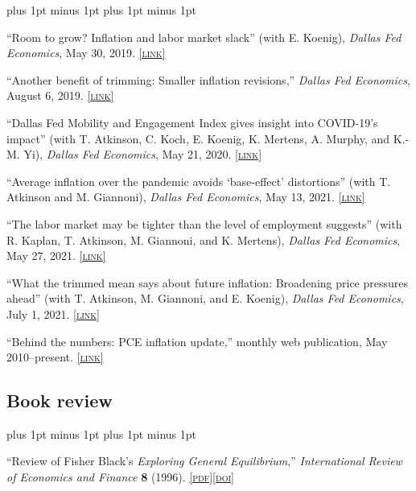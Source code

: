 \documentclass[letterpaper]{article}
\renewenvironment{itemize}{
  \begin{list}{}{
    \setlength{\leftmargin}{1.5em}
    \itemsep -1pt plus 1pt minus 1pt
    \topsep -1pt plus 1pt minus 1pt
  }
}{
  \end{list}
}
\newcommand{\pdf}[1]{\href{#1}{\scriptsize\textsc{[pdf]}}}
\newcommand{\doi}[1]{\href{http://dx.doi.org/#1}{\scriptsize\textsc{[doi]}}}
\newcommand{\link}[1]{\href{#1}{\scriptsize\textsc{[link]}}}
\begin{document}
\begin{itemize}
\item ``Room to grow? Inflation and labor market slack'' (with E. Koenig), \textit{Dallas Fed Economics}, May 30, 2019. \link{https://www.dallasfed.org/research/economics/2019/0530}

\item ``Another benefit of trimming: Smaller inflation revisions,'' \textit{Dallas Fed Economics}, August 6, 2019. \link{https://www.dallasfed.org/research/economics/2019/0806}

\item ``Dallas Fed Mobility and Engagement Index gives insight into COVID-19's impact'' (with T. Atkinson, C. Koch, E. Koenig, K. Mertens, A. Murphy, and K.-M. Yi), \textit{Dallas Fed Economics}, May 21, 2020. \link{https://www.dallasfed.org/research/economics/2020/0521}

\item ``Average inflation over the pandemic avoids `base-effect' distortions'' (with T. Atkinson and M. Giannoni), \textit{Dallas Fed Economics}, May 13, 2021. \link{https://www.dallasfed.org/research/economics/2021/0513}

\item ``The labor market may be tighter than the level of employment suggests'' (with R. Kaplan, T. Atkinson, M. Giannoni, and K. Mertens), \textit{Dallas Fed Economics}, May 27, 2021. \link{https://www.dallasfed.org/research/economics/2021/0527}

\item ``What the trimmed mean says about future inflation: Broadening price pressures ahead'' (with T. Atkinson, M. Giannoni, and E. Koenig), \textit{Dallas Fed Economics}, July 1, 2021. \link{https://www.dallasfed.org/research/economics/2021/0701}

\item ``Behind the numbers: PCE inflation update,'' monthly web publication, May 2010--present.  \link{http://dallasfed.org/research/pce/inflation.cfm} 
\end{itemize}

\subsection*{Book review}
\begin{itemize}
\item ``Review of Fisher Black's \textit{Exploring General Equilibrium},'' \textit{International Review of Economics and Finance} \textbf{8} (1996). \pdf{https://jimdolmas.github.io/assets/fisher_black.pdf}\doi{10.1016/S1059-0560(96)90038-6}
\end{itemize}
\end{document}
